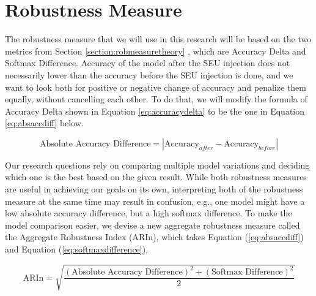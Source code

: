 \documentclass[ %
                    author={Revalda Putawara},
                supervisor={Dr. James Pope},
                    degree={MSc},
                     title={Robustness of Bayesian Neural Networks Design Choices Against Weight and Bias Perturbation Induced by Single Event Upsets (SEUs)},
                      type={},
                      year={2025}]{dissertation}
\begin{document}
\section{Robustness Measure}

The robustness measure that we will use in this research will be based on the two metrics from Section \ref{section:robmeasuretheory} , which are Accuracy Delta and Softmax Difference. Accuracy of the model after the SEU injection does not necessarily lower than the accuracy before the SEU injection is done, and we want to look both for positive or negative change of accuracy and penalize them equally, without cancelling each other. To do that, we will modify the formula of Accuracy Delta shown in Equation \ref{eq:accuracydelta} to be the one in Equation \ref{eq:absaccdiff} below.


    \begin{equation} \label{eq:absaccdiff}
    \text{Absolute Accuracy Difference} = \left|\text{Accuracy}_{after} - \text{Accuracy}_{before} \right|
    \end{equation}


Our research questions rely on comparing multiple model variations and deciding which one is the best based on the given result. While both robustness measures are useful in achieving our goals on its own, interpreting both of the robustness measure at the same time may result in confusion, e.g., one model might have a low absolute accuracy difference, but a high softmax difference. To make the model comparison easier, we devise a new aggregate robustness measure called the Aggregate Robustness Index (ARIn), which takes Equation (\ref{eq:absaccdiff}) and Equation (\ref{eq:softmaxdifference}).

\begin{equation}
\text{ARIn} = \sqrt{\frac{\left(\text{Absolute Accuracy Difference}\right)^2 + \left({\text{Softmax Difference}}\right)^2}{2}}
\label{eq:ARIn}
\end{equation}



\end{document}
